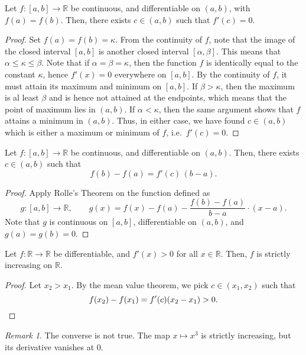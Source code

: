 \documentclass[11pt]{article}
\def\R{\mathbb{R}}
\theoremstyle{definition}
\theoremstyle{remark}
\newtheorem*{remark}{Remark}
\numberwithin{equation}{module}
\begin{document}
    \begin{theorem}
        Let $f\colon [a, b] \to \R$ be continuous, and differentiable on $(a, b)$,
        with $f(a) = f(b)$. Then, there exists $c \in (a, b)$ such that $f'(c) = 0$.
    \end{theorem}
    \begin{proof}
        Set $f(a) = f(b) = \kappa$.
        From the continuity of $f$, note that the image of the closed interval $[a,
        b]$ is another closed interval $[\alpha, \beta]$. This means that $\alpha
        \leq \kappa \leq \beta$. Note that if $\alpha = \beta = \kappa$, then the
        function $f$ is identically equal to the constant $\kappa$, hence $f'(x) =
        0$ everywhere on $[a, b]$. By the continuity of $f$, it must attain its
        maximum and minimum on $[a, b]$. If $\beta > \kappa$, then the maximum is al
        least $\beta$ and is hence not attained at the endpoints, which means that
        the point of maximum lies in $(a, b)$. If $\alpha < \kappa$, then the same
        argument shows that $f$ attains a minimum in $(a, b)$. Thus, in either case,
        we have found $c \in (a, b)$ which is either a maximum or minimum of $f$,
        i.e.\ $f'(c) = 0$.
    \end{proof}

    \begin{theorem}
        Let $f\colon [a, b] \to \R$ be continuous, and differentiable on $(a, b)$.
        Then, there exists $c \in (a, b)$ such that \[
            f(b) - f(a) = f'(c)\, (b - a).
        \] 
    \end{theorem}
    \begin{proof}
        Apply Rolle's Theorem on the function defined as \[
            g\colon [a, b] \to \R, \qquad
            g(x) = f(x) - f(a) - \frac{f(b) - f(a)}{b - a}\cdot(x - a).
        \] Note that $g$ is continuous on $[a, b]$, differentiable on $(a, b)$, and
        $g(a) = g(b) = 0$.
    \end{proof}

    \begin{theorem}
        Let $f\colon \R \to \R$ be differentiable, and $f'(x) > 0$ for all $x \in
        \R$. Then, $f$ is strictly increasing on $\R$.
    \end{theorem}
    \begin{proof}
        Let $x_2 > x_1$. By the mean value theorem, we pick $c \in (x_1, x_2)$
        such that \[
            f(x_2) - f(x_1) = f'(c) (x_2 - x_1) > 0. \qedhere
        \] 
    \end{proof}
    \begin{remark}
        The converse is not true. The map $x \mapsto x^3$ is strictly increasing,
        but its derivative vanishes at $0$.
    \end{remark}
\end{document}
